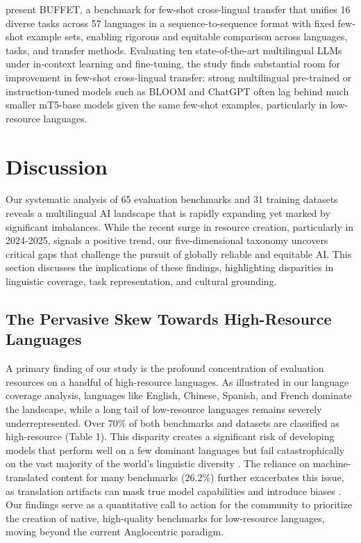 \documentclass[acmsmall]{acmart}
\begin{document}
\citep{asai2023buffetbenchmarkinglargelanguage} present BUFFET, a benchmark for few-shot cross-lingual transfer that unifies 16 diverse tasks across 57 languages in a sequence-to-sequence format with fixed few-shot example sets, enabling rigorous and equitable comparison across languages, tasks, and transfer methods. Evaluating ten state-of-the-art multilingual LLMs under in-context learning and fine-tuning, the study finds substantial room for improvement in few-shot cross-lingual transfer: strong multilingual pre-trained or instruction-tuned models such as BLOOM and ChatGPT often lag behind much smaller mT5-base models given the same few-shot examples, particularly in low-resource languages.

















\section{Discussion}

Our systematic analysis of 65 evaluation benchmarks and 31 training datasets reveals a multilingual AI landscape that is rapidly expanding yet marked by significant imbalances. While the recent surge in resource creation, particularly in 2024-2025, signals a positive trend, our five-dimensional taxonomy uncovers critical gaps that challenge the pursuit of globally reliable and equitable AI. This section discusses the implications of these findings, highlighting disparities in linguistic coverage, task representation, and cultural grounding.

\subsection{The Pervasive Skew Towards High-Resource Languages}

A primary finding of our study is the profound concentration of evaluation resources on a handful of high-resource languages. As illustrated in our language coverage analysis, languages like English, Chinese, Spanish, and French dominate the landscape, while a long tail of low-resource languages remains severely underrepresented. Over 70\% of both benchmarks and datasets are classified as high-resource (Table 1). This disparity creates a significant risk of developing models that perform well on a few dominant languages but fail catastrophically on the vast majority of the world's linguistic diversity \citep{blodgett-etal-2020-language}. The reliance on machine-translated content for many benchmarks (26.2\%) further exacerbates this issue, as translation artifacts can mask true model capabilities and introduce biases \citep{smith2024implementingonlinereinforcementlearning}. Our findings serve as a quantitative call to action for the community to prioritize the creation of native, high-quality benchmarks for low-resource languages, moving beyond the current Anglocentric paradigm.
\end{document}
